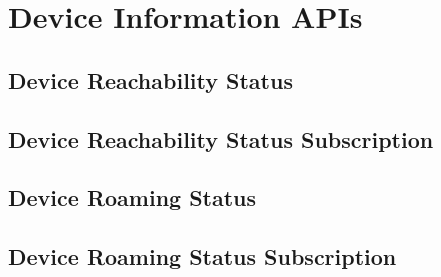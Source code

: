 
\section{Device Information APIs}
\subsection{Device Reachability Status}
\subsection{Device Reachability Status Subscription}
\subsection{Device Roaming Status}
\subsection{Device Roaming Status Subscription}
